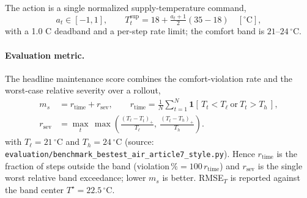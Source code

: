 \documentclass[11pt,a4paper]{article}
\begin{document}
The action is a single normalized supply-temperature command,
\begin{equation}
  a_t \in [-1,1],
  \qquad
  T^{\mathrm{sup}}_t = 18 + \tfrac{a_t+1}{2}(35-18)\quad [^\circ\mathrm{C}],
  \label{eq:action_map}
\end{equation}
with a 1.0 C deadband and a per-step rate limit; the comfort band is $21$--$24\,^\circ$C.

\paragraph{Evaluation metric.} The headline maintenance score combines the comfort-violation rate and the worst-case relative severity over a rollout,
\begin{equation}
\begin{aligned}
  m_s &= r_{\mathrm{time}} + r_{\mathrm{sev}},
  \qquad
  r_{\mathrm{time}} = \frac{1}{N}\sum_{t=1}^{N} \mathbf{1}\!\left[\,T_t < T_{\ell}\ \text{or}\ T_t > T_{h}\,\right], \\[3pt]
  r_{\mathrm{sev}} &= \max_{t}\, \max\!\left(\frac{(T_{\ell}-T_t)_+}{T_{\ell}},\ \frac{(T_t-T_{h})_+}{T_{h}}\right).
\end{aligned}
\label{eq:ms}
\end{equation}
with $T_{\ell}=21\,^\circ$C and $T_{h}=24\,^\circ$C (source: \texttt{evaluation/benchmark\_bestest\_air\_article7\_style.py}). Hence $r_{\mathrm{time}}$ is the fraction of steps outside the band (violation\,$\%=100\,r_{\mathrm{time}}$) and $r_{\mathrm{sev}}$ is the single worst relative band exceedance; lower $m_s$ is better. RMSE$_T$ is reported against the band center $T^{\star}=22.5\,^\circ$C.
\end{document}
